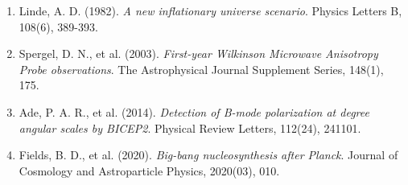 \documentclass[a4paper, 11pt]{article}
\begin{document}
\begin{enumerate}
\item Linde, A. D. (1982). \textit{A new inflationary universe scenario}. Physics Letters B, 108(6), 389-393.
\item Spergel, D. N., et al. (2003). \textit{First-year Wilkinson Microwave Anisotropy Probe
observations}. The Astrophysical Journal Supplement Series, 148(1), 175.
\item Ade, P. A. R., et al. (2014). \textit{Detection of B-mode polarization at degree angular
scales by BICEP2}. Physical Review Letters, 112(24), 241101.
\item Fields, B. D., et al. (2020). \textit{Big-bang nucleosynthesis after Planck}.
Journal of Cosmology and Astroparticle Physics, 2020(03), 010.
\end{enumerate}
\end{document}
